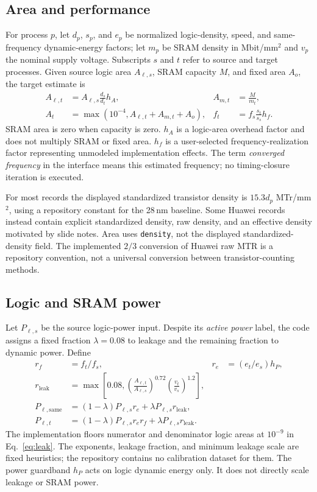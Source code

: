 \documentclass[11pt,a4paper]{article}
\begin{document}
\subsection{Area and performance}
For process $p$, let $d_p$, $s_p$, and $e_p$ be normalized logic-density,
speed, and same-frequency dynamic-energy factors; let $m_p$ be SRAM density
in Mbit/mm$^2$ and $v_p$ the nominal supply voltage. Subscripts $s$ and $t$
refer to source and target processes. Given source logic area $A_{\ell,s}$,
SRAM capacity $M$, and fixed area $A_o$, the target estimate is
\begin{align}
A_{\ell,t} &= A_{\ell,s}\frac{d_s}{d_t}h_A, &
A_{m,t} &= \frac{M}{m_t}, \label{eq:area}\\
A_t &= \max(10^{-4},A_{\ell,t}+A_{m,t}+A_o),&
f_t &= f_s\frac{s_t}{s_s}h_f . \label{eq:freq}
\end{align}
SRAM area is zero when capacity is zero. $h_A$ is a logic-area overhead
factor and does not multiply SRAM or fixed area. $h_f$ is a user-selected
frequency-realization factor representing unmodeled implementation effects.
The term \emph{converged frequency} in the interface means this estimated
frequency; no timing-closure iteration is executed.

For most records the displayed standardized transistor density is
$15.3d_p$ MTr/mm$^2$, using a repository constant for the 28\,nm baseline.
Some Huawei records instead contain explicit standardized density, raw
density, and an effective density motivated by slide notes. Area uses
\texttt{density}, not the displayed standardized-density field. The
implemented $2/3$ conversion of Huawei raw MTR is a repository convention,
not a universal conversion between transistor-counting methods.

\subsection{Logic and SRAM power}
Let $P_{\ell,s}$ be the source logic-power input. Despite its \emph{active power}
label, the code assigns a fixed fraction $\lambda=0.08$ to leakage and the
remaining fraction to dynamic power. Define
\begin{align}
r_f &= f_t/f_s, &
r_e &= (e_t/e_s)h_P,\\
r_{\mathrm{leak}} &=
\max\left[0.08,
  \left(\frac{A_{\ell,t}}{A_{\ell,s}}\right)^{0.72}
  \left(\frac{v_t}{v_s}\right)^{1.2}\right], \label{eq:leak}\\
P_{\ell,\mathrm{same}} &=
(1-\lambda)P_{\ell,s}r_e+\lambda P_{\ell,s}r_{\mathrm{leak}},\\
P_{\ell,t} &=
(1-\lambda)P_{\ell,s}r_e r_f+\lambda P_{\ell,s}r_{\mathrm{leak}}.
\label{eq:power}
\end{align}
The implementation floors numerator and denominator logic areas at
$10^{-9}$ in Eq.~\ref{eq:leak}. The exponents, leakage fraction, and minimum
leakage scale are fixed heuristics; the repository contains no calibration
dataset for them. The power guardband $h_P$ acts on logic dynamic energy
only. It does not directly scale leakage or SRAM power.
\end{document}
